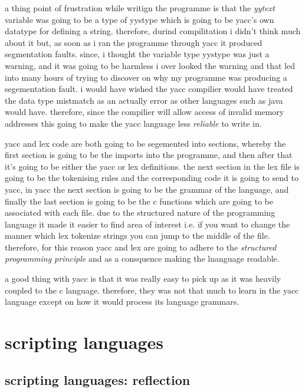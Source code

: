 \documentclass[
	12pt, %
]{fphw}
\begin{document}
a thing point of frustration while writign the programme is that the \emph{yytext}
variable was going to be a type of yystype which is going to be yacc's own datatype
for defining a string. therefore, durind compilitation i didn't think much about
it but, as soon as i ran the programme through yacc it produced segmentation faults.
since, i thought the variable type yystype was just a warning, and it was
going to be harmless i over looked the warning and that led into many hours of
trying to discover on why my programme was producing a segementation fault. i
would have wished the yacc compilier would have treated the data type mistmatch
as an actually error as other languages such as java would have. therefore,
since the compilier will allow access of invalid memory addresses this going to
make the yacc language less \emph{reliable} to write in. \par

yacc and lex code are both going to be segemented into sections, whereby the
first section is going to be the imports into the programme, and then after that
it's going to be either the yacc or lex definitions. the next section in the lex
file is going to be the tokenising rules and the corresponding code it is going
to send to yacc, in yacc the next section is going to be the grammar of the
language, and finally the last section is going to be the c functions which are
going to be associated with each file. due to the structured nature of the
programming language it made it easier to find area of interest i.e. if you want
to change the manner which lex tokenize strings you can jump to the middle of the
file. therefore, for this reason yacc and lex are going to adhere to the
\emph{structured programming principle} and as a consquence making the lnanguage
readable.\par

a good thing with yacc is that it was really easy to pick up as it was heavily
coupled to the c language. therefore, they was not that much to learn in the
yacc language except on how it would process its language grammars. \par

\section{scripting languages}


\subsection{scripting languages: reflection}
\end{document}
